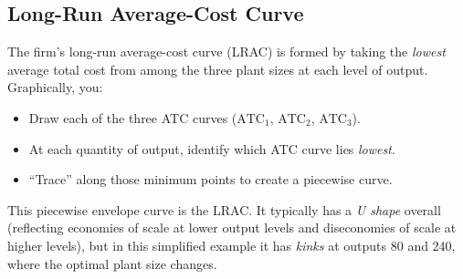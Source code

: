 \documentclass[12pt]{article}
\begin{document}
\subsection*{Long-Run Average-Cost Curve}
The firm’s long-run average-cost curve (LRAC) is formed by taking the \emph{lowest} average total cost from among the three plant sizes at each level of output. Graphically, you:
\begin{itemize}[noitemsep]
  \item Draw each of the three ATC curves (\(\text{ATC}_1\), \(\text{ATC}_2\), \(\text{ATC}_3\)).
  \item At each quantity of output, identify which ATC curve lies \emph{lowest}.
  \item ``Trace'' along those minimum points to create a piecewise curve.
\end{itemize}
This piecewise envelope curve is the LRAC. It typically has a \emph{U shape} overall (reflecting economies of scale at lower output levels and diseconomies of scale at higher levels), but in this simplified example it has \emph{kinks} at outputs 80 and 240, where the optimal plant size changes.

\bigskip
\begin{center}
\end{center}
\end{document}
